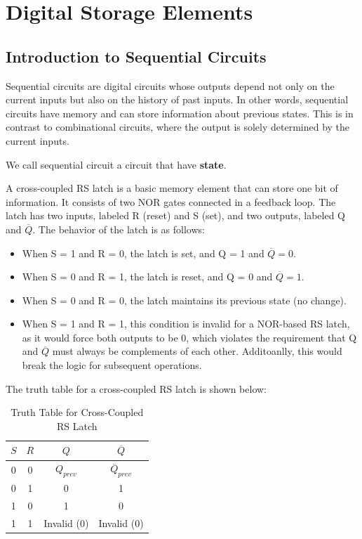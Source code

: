 \documentclass[11pt]{report}
\begin{document}
\section{Digital Storage Elements}
\subsection{Introduction to Sequential Circuits}
\begin{definition} 
    Sequential circuits are digital circuits whose outputs depend not only on the current inputs but also on the history of past inputs. In other words, sequential circuits have memory and can store information about previous states. This is in contrast to combinational circuits, where the output is solely determined by the current inputs.

    We call sequential circuit a circuit that have \textbf{state}.
\end{definition}
\begin{definition}
    A cross-coupled RS latch is a basic memory element that can store one bit of information. It consists of two NOR gates connected in a feedback loop. The latch has two inputs, labeled R (reset) and S (set), and two outputs, labeled Q and $\overline{Q}$. The behavior of the latch is as follows:
    \begin{itemize}
        \item When S = 1 and R = 0, the latch is set, and Q = 1 and $\overline{Q} = 0$.
        \item When S = 0 and R = 1, the latch is reset, and Q = 0 and $\overline{Q} = 1$.
        \item When S = 0 and R = 0, the latch maintains its previous state (no change).
        \item When S = 1 and R = 1, this condition is invalid for a NOR-based RS latch, as it would force both outputs to be 0, which violates the requirement that Q and $\overline{Q}$ must always be complements of each other. Additoanlly, this would break the logic for subsequent operations.
    \end{itemize}
    The truth table for a cross-coupled RS latch is shown below:
    \begin{table}[h!]
        \centering
        \begin{tabular}{|c|c||c|c|}
            \hline
            $S$ & $R$ & $Q$ & $\overline{Q}$ \\
            \hline
            0 & 0 & $Q_{prev}$ & $\overline{Q}_{prev}$ \\
            0 & 1 & 0 & 1 \\
            1 & 0 & 1 & 0 \\
            1 & 1 & Invalid (0) & Invalid (0) \\
            \hline
        \end{tabular}
        \caption{Truth Table for Cross-Coupled RS Latch}
        \label{tab:rs_latch_truth_table}
    \end{table}
\end{definition}
\end{document}
